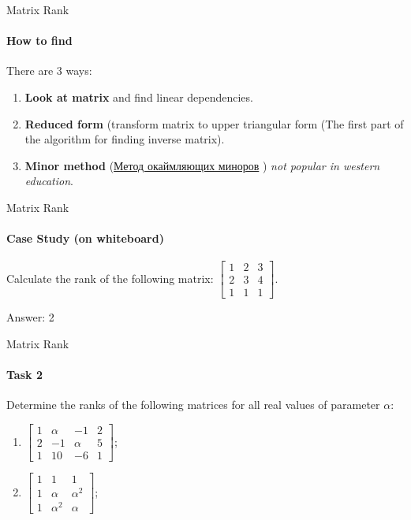\documentclass[aspectratio=169,notes]{beamer}
\begin{document}
    \begin{frame}[t]{Matrix Rank}
    \framesubtitle{How to find}
        There are 3 ways:
        \begin{enumerate}
            \item \textbf{Look at matrix} and find linear dependencies.
            \item \textbf{Reduced form} (transform matrix to upper triangular form (The first part of the algorithm for finding inverse matrix).
            \item \textbf{Minor method} (\href{http://www.mathprofi.ru/rang_matricy.html}{Метод окаймляющих миноров} ) \textit{not popular in western education}.
        \end{enumerate}
    \end{frame}


\begin{frame}[t]{Matrix Rank}
\framesubtitle{Case Study (on whiteboard)}
Calculate the rank of the following matrix: $\begin{bmatrix}1&2&3\\2&3&4\\1&1&1\end{bmatrix}$. \medskip

\alert{\Large Answer: 2}
\end{frame}

\begin{frame}[t]{Matrix Rank}
\framesubtitle{Task 2}
Determine the ranks of the following matrices for all real values of parameter $\alpha$:
\begin{enumerate}

    \item $\begin{bmatrix}1&\alpha&-1&2\\2&-1&\alpha&5\\1&10&-6&1\end{bmatrix}$;
    \item $\begin{bmatrix}1&1&1\\1&\alpha&\alpha^2\\1&\alpha^2&\alpha\end{bmatrix}$;
\end{enumerate}
\end{frame}
\end{document}
